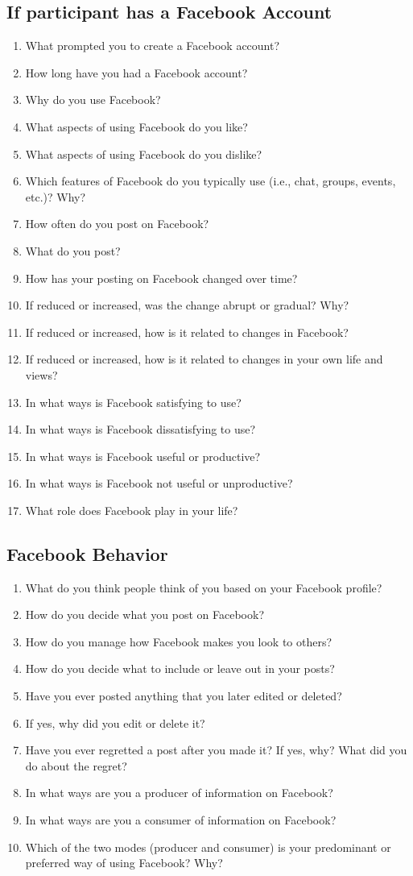 \subsection{If participant has a Facebook Account}
\begin{enumerate}
\item What prompted you to create a Facebook account?
\item How long have you had a Facebook account?
\item Why do you use Facebook?
\item What aspects of using Facebook do you like?
\item What aspects of using Facebook do you dislike?
\item Which features of Facebook do you typically use (i.e., chat, groups, events, etc.)? Why?
\item How often do you post on Facebook?
\item What do you post?
\item How has your posting on Facebook changed over time?
\item If reduced or increased, was the change abrupt or gradual? Why?
\item If reduced or increased, how is it related to changes in Facebook?
\item If reduced or increased, how is it related to changes in your own life and views?
\item In what ways is Facebook satisfying to use?
\item In what ways is Facebook dissatisfying to use?
\item In what ways is Facebook useful or productive?
\item In what ways is Facebook not useful or unproductive?
\item What role does Facebook play in your life?
\end{enumerate}
\subsection{Facebook Behavior}
\begin{enumerate}
\item What do you think people think of you based on your Facebook profile?
\item How do you decide what you post on Facebook?
\item How do you manage how Facebook makes you look to others?
\item How do you decide what to include or leave out in your posts?
\item Have you ever posted anything that you later edited or deleted?
\item If yes, why did you edit or delete it?
\item Have you ever regretted a post after you made it? If yes, why? What did you do about the regret?
\item In what ways are you a producer of information on Facebook?
\item In what ways are you a consumer of information on Facebook?
\item Which of the two modes (producer and consumer) is your predominant or preferred way of using Facebook? Why? 
\end{enumerate}
